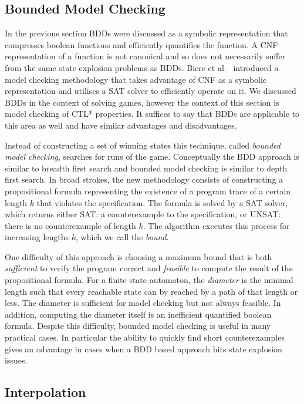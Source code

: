 \subsection{Bounded Model Checking}

In the previous section BDDs were discussed as a symbolic representation that compresses boolean functions and efficiently quantifies the function. A CNF representation of a function is not canonical and so does not necessarily suffer from the same state explosion problems as BDDs. Biere et al.~\cite{Biere99} introduced a model checking methodology that takes advantage of CNF as a symbolic representation and utilises a SAT solver to efficiently operate on it. We discussed BDDs in the context of solving games, however the context of this section is model checking of CTL* properties. It suffices to say that BDDs are applicable to this area as well and have similar advantages and disadvantages.

Instead of constructing a set of winning states this technique, called \emph{bounded model checking}, searches for runs of the game. Conceptually the BDD approach is similar to breadth first search and bounded model checking is similar to depth first search. In broad strokes, the new methodology consists of constructing a propositional formula representing the existence of a program trace of a certain length $k$ that violates the specification. The formula is solved by a SAT solver, which returns either SAT: a counterexample to the specification, or UNSAT: there is no counterexample of length $k$. The algorithm executes this process for increasing lengths $k$, which we call the \emph{bound}.

One difficulty of this approach is choosing a maximum bound that is both \emph{sufficient} to verify the program correct and \emph{feasible} to compute the result of the propositional formula. For a finite state automaton, the \emph{diameter} is the minimal length such that every reachable state can by reached by a path of that length or less. The diameter is sufficient for model checking but not always feasible. In addition, computing the diameter itself is an inefficient quantified boolean formula. Despite this difficulty, bounded model checking is useful in many practical cases. In particular the ability to quickly find short counterexamples gives an advantage in cases when a BDD based approach hits state explosion issues.

\subsection{Interpolation}
